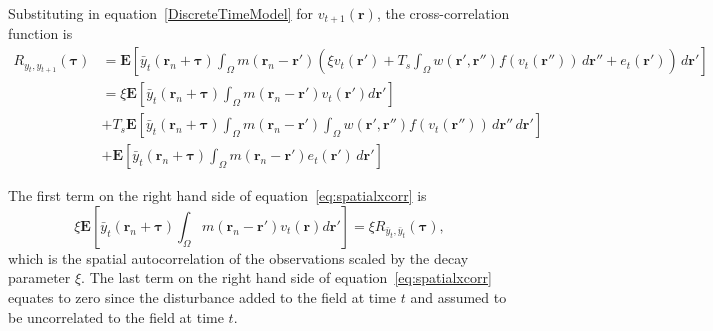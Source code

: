 \documentclass[review,authoryear,3p]{elsarticle}
\begin{document}
Substituting in equation~\ref{DiscreteTimeModel}  for $v_{t+1}\left(\mathbf{r}\right)$, the cross-correlation function is
\begin{align}
	R_{y_{t},y_{t+1}}(\boldsymbol{\tau}) &= \mathbf{E}\left[\bar{y}_t\left(\mathbf{r}_n + \boldsymbol{\tau}\right) \int_{\Omega}{m\left(\mathbf{r}_n-\mathbf{r}'\right) \left(\xi v_t\left(\mathbf{r}'\right) +T_s \int_\Omega { w\left(\mathbf{r}',\mathbf{r}''\right) f\left(v_t\left(\mathbf{r}''\right)\right)\, d\mathbf{r}''} + e_t\left(\mathbf{r}'\right)\right)\, d\mathbf{r}'} \right] \\	
	 &= \xi\mathbf{E}\left[\bar{y}_t\left(\mathbf{r}_n + \boldsymbol{\tau}\right)\int_{\Omega}{ m\left(\mathbf{r}_n - \mathbf{r}'\right) v_t\left(\mathbf{r}'\right) d\mathbf{r}'} \right] \nonumber \\
	&+ T_s\mathbf{E}\left[\bar{y}_t\left(\mathbf{r}_n + \boldsymbol{\tau}\right) \int_{\Omega} {m\left(\mathbf{r}_n-\mathbf{r}'\right) \int_\Omega { w\left(\mathbf{r}',\mathbf{r}''\right) f\left(v_t\left(\mathbf{r}''\right)\right)\, d\mathbf{r}''}\, d\mathbf{r}'} \right] \nonumber \\
	&+ \mathbf{E}\left[\bar{y}_t\left(\mathbf{r}_n + \boldsymbol{\tau}\right)\int_{\Omega} { m\left(\mathbf{r}_n-\mathbf{r}'\right) e_t \left(\mathbf{r}'\right)\, d\mathbf{r}' } \right]
	\label{eq:spatialxcorr}
\end{align}

The first term on the right hand side of equation~\ref{eq:spatialxcorr} is
\begin{equation}
	\xi\mathbf{E}\left[\bar{y}_t\left(\mathbf{r}_n + \boldsymbol{\tau}\right) \int_{\Omega}{ m\left(\mathbf{r}_n-\mathbf{r}'\right) v_t\left(\mathbf{r}\right) d\mathbf{r}'} \right] = \xi R_{\bar{y}_{t},\bar{y}_{t}}(\boldsymbol{\tau}),
\end{equation}
which is the spatial autocorrelation of the observations scaled by the decay parameter $\xi$. The last term on the right hand side of equation~\ref{eq:spatialxcorr} equates to zero since the disturbance added to the field at time $t$ and assumed to be uncorrelated to the field at time $t$. 
\end{document}
